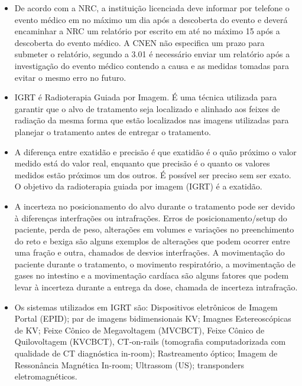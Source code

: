 \documentclass[11pt,a4paper]{article}
\newcounter{exemplo}
\begin{document}
\begin{exemplo}[Qualidade]
\begin{itemize}
        \item De acordo com a NRC, a instituição licenciada deve informar por telefone o evento médico em no máximo um dia após a descoberta do evento e deverá encaminhar a NRC um relatório por escrito em até no máximo 15 após a descoberta do evento médico. A CNEN não especifica um prazo para submeter o relatório, segundo a 3.01 é necessário enviar um relatório após a investigação do evento médico contendo a causa e as medidas tomadas para evitar o mesmo erro no futuro. 

    \end{itemize}
    
\end{exemplo}

\begin{exemplo}[IGRT]

    \begin{itemize}
        \item IGRT é Radioterapia Guiada por Imagem. É uma técnica utilizada para garantir que o alvo de tratamento seja localizado e alinhado aos feixes de radiação da mesma forma que estão localizados nas imagens utilizadas para planejar o tratamento antes de entregar o tratamento.
        
        \item A diferença entre exatidão e precisão é que exatidão é o quão próximo o valor medido está do valor real, enquanto que precisão é o quanto os valores medidos estão próximos um dos outros. É possível ser preciso sem ser exato. O objetivo da radioterapia guiada por imagem (IGRT) é a exatidão.
        
        \item A incerteza no posicionamento do alvo durante o tratamento pode ser devido à diferenças interfrações ou intrafrações. Erros de posicionamento/setup do paciente, perda de peso, alterações em volumes e variações no preenchimento do reto e bexiga são alguns exemplos de alterações que podem ocorrer entre uma fração e outra, chamados de desvios interfrações. A movimentação do paciente durante o tratamento, o movimento respiratório, a movimentação de gases no intestino e a movimentação cardíaca são alguns fatores que podem levar à incerteza durante a entrega da dose, chamada de incerteza intrafração.
        
        \item Os sistemas utilizados em IGRT são: Dispositivos eletrônicos de Imagem Portal (EPID); par de imagens bidimensionais KV; Imagnes Estereoscópicas de KV; Feixe Cônico de Megavoltagem (MVCBCT), Feixe Cônico de Quilovoltagem (KVCBCT), CT-on-rails (tomografia computadorizada com qualidade de CT diagnóstica in-room); Rastreamento óptico; Imagem de Ressonância Magnética In-room; Ultrassom (US); transponders eletromagnéticos.
        

\end{itemize}
\end{exemplo}
\end{document}
